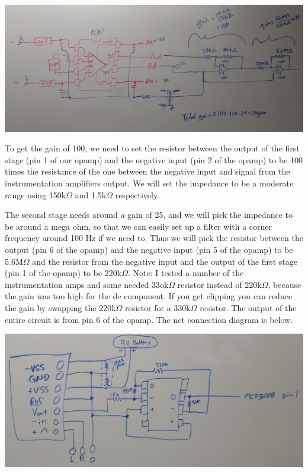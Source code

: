 \includegraphics[width=\textwidth]{../images/EMG_complete.jpg}

To get the gain of 100, we need to set the resistor between the output of the first stage (pin 1 of our opamp) and the negative input (pin 2 of the opamp) to be 100 times the resistance of the one between the negative input and signal from the instrumentation amplifiers output.  We will set the impedance to be a moderate range using 150k$\Omega$ and  1.5k$\Omega$ respectively.  %

The second stage needs around a gain of 25, and we will pick the impedance to be around a mega ohm, so that we can easily set up a filter with a corner frequency around 100 Hz if we need to.  Thus we will pick the resistor between the output (pin 6 of the opamp) and the negative input (pin 5 of the opamp) to be 5.6M$\Omega$ and the resistor from the negative input and the output of the first stage (pin 1 of the opamp) to be 220k$\Omega$.  Note: I tested a number of the instrumentation amps and some needed 33ok$\Omega$ resistor instead of 220k$\Omega$, because the gain was too high for the dc component.  If you get clipping you can reduce the gain by swapping the 220k$\Omega$ resistor for a 330k$\Omega$ resistor.  The output of the entire circuit is from pin 6 of the opamp.  The net connection diagram is below.

\includegraphics[width=\textwidth]{../images/EMG_connect.jpg}

